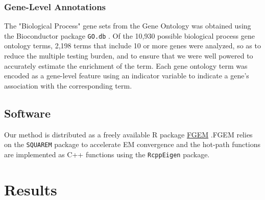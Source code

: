 \subsubsection{Gene-Level Annotations}
\label{sec:orgd117550}

The "Biological Process" gene sets from the Gene Ontology was obtained using the Bioconductor package \texttt{GO.db} \cite{godb}. Of the 10,930 possible biological process gene ontology terms, 2,198 terms that 
include 10 or more genes were analyzed, so as to reduce the multiple testing burden, and to ensure that we were well powered to accurately estimate the enrichment of the term.  Each gene ontology term was encoded as a gene-level feature using an indicator variable to indicate a gene's association with the corresponding term. 


\subsection{Software}
\label{sec:org56b3320}

Our method is distributed as a freely available R package \href{https://github.com/CreRecombinase/FGEM}{FGEM} \cite{Rlang} .FGEM relies on the \texttt{SQUAREM} package to accelerate EM convergence\cite{squarem}   
and the hot-path functions are implemented as C++ functions using the \texttt{RcppEigen} \cite{RcppEigen} package.  


\section{Results}
\label{sec:org6fb4837}

